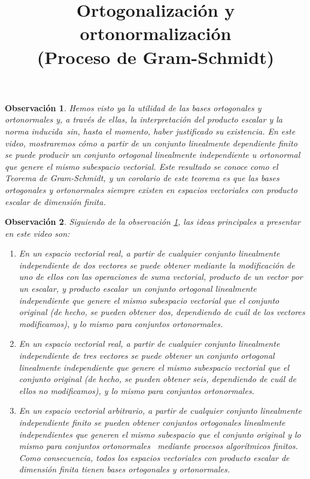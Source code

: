 \documentclass[12pt,dvipsnames]{article}
\newtheorem{obs}{Observación}[section]
\numberwithin{equation}{section}
\begin{document}
\title{Ortogonalización y ortonormalización \\ (Proceso de Gram-Schmidt)}
\date{}
\maketitle

\begin{obs}\label{obs:1}
    Hemos visto ya la utilidad de las bases ortogonales y ortonormales \textemdash y, a través de ellas, la interpretación del producto escalar y la norma inducida\textemdash \ sin, hasta el momento, haber justificado su existencia. En este video, mostraremos cómo a partir de un conjunto linealmente dependiente finito se puede producir un conjunto ortogonal linealmente independiente u ortonormal que genere el mismo subespacio vectorial. Este resultado se conoce como el Teorema de Gram-Schmidt, y un corolario de este teorema es que las bases ortogonales y ortonormales siempre existen en espacios vectoriales con producto escalar de dimensión finita.
\end{obs}

\begin{obs}
Siguiendo de la observación \ref{obs:1}, las ideas principales a presentar en este video son:

\begin{enumerate}[label=(\roman*)]
    \item En un espacio vectorial real, a partir de cualquier conjunto linealmente independiente de dos vectores se puede obtener \textemdash mediante la modificación de uno de ellos con las operaciones de suma vectorial, producto de un vector por un escalar, y producto escalar\textemdash \ un conjunto ortogonal linealmente independiente que genere el mismo subespacio vectorial que el conjunto original (de hecho, se pueden obtener dos, dependiendo de cuál de los vectores modificamos), y lo mismo para conjuntos ortonormales.
    
    \item En un espacio vectorial real, a partir de cualquier conjunto linealmente independiente de tres vectores se puede obtener un conjunto ortogonal linealmente independiente que genere el mismo subespacio vectorial que el conjunto original (de hecho, se pueden obtener seis, dependiendo de cuál de ellos no modificamos), y lo mismo para conjuntos ortonormales.

    \item En un espacio vectorial arbitrario, a partir de cualquier conjunto linealmente independiente finito se pueden obtener conjuntos ortogonales linealmente independientes que generen el mismo subespacio que el conjunto original \textemdash y lo mismo para conjuntos ortonormales \textemdash \ mediante procesos algorítmicos finitos. Como consecuencia, todos los espacios vectoriales con producto escalar de dimensión finita tienen bases ortogonales y ortonormales.
\end{enumerate}
\end{obs}
\end{document}
